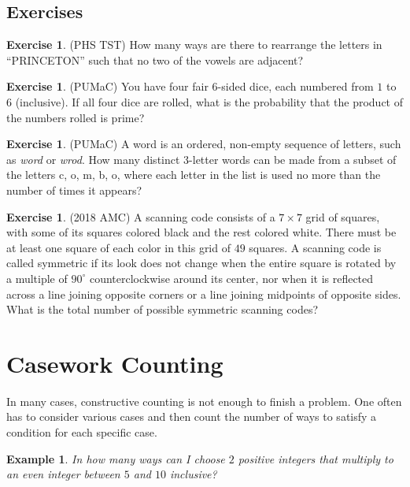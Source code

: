 \documentclass[letterpaper]{article}
\newtheorem{example}[thm]{Example}
\theoremstyle{remark}
\theoremstyle{definition}
\newtheorem{exercise}[thm]{Exercise}
\begin{document}
\subsection*{Exercises}

\begin{exercise}
(PHS TST) How many ways are there to rearrange the letters in “PRINCETON” such that no two of the vowels are
adjacent?
\end{exercise}

\begin{exercise}
(PUMaC) You have four fair $6$-sided dice, each numbered from $1$ to $6$ (inclusive). If all four dice are rolled, what is the probability that the product of the numbers rolled is prime?
\end{exercise}

\begin{exercise}
(PUMaC) A word is an ordered, non-empty sequence of letters, such as \textit{word} or \textit{wrod}. How many
distinct 3-letter words can be made from a subset of the letters c, o, m, b, o, where each letter
in the list is used no more than the number of times it appears?
\end{exercise}

\begin{exercise}
(2018 AMC) A scanning code consists of a $7 \times 7$ grid of squares, with some of its squares colored black and the rest colored white. There must be at least one square of each color in this grid of $49$ squares. A scanning code is called symmetric if its look does not change when the entire square is rotated by a multiple of $90 ^{\circ}$ counterclockwise around its center, nor when it is reflected across a line joining opposite corners or a line joining midpoints of opposite sides. What is the total number of possible symmetric scanning codes?
\end{exercise}

\section{Casework Counting}
In many cases, constructive counting is not enough to finish a problem. One often has to consider various cases and then count the number of ways to satisfy a condition for each specific case. 

\begin{example}
In how many ways can I choose $2$ positive integers that multiply to an even integer between $5$ and $10$ inclusive?
\end{example}
\end{document}
